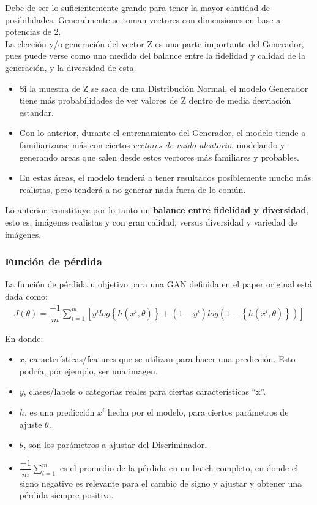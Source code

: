 Debe de ser lo suficientemente grande para tener la mayor cantidad de posibilidades. Generalmente se toman vectores con dimensiones en base a potencias de 2.\\
La elección y/o generación del vector Z es una parte importante del Generador, pues puede verse como una medida del balance entre la fidelidad y calidad de la generación, y la diversidad de esta.
\begin{itemize}
    \item Si la muestra de Z se saca de una Distribución Normal, el modelo Generador tiene más probabilidades de ver valores de Z dentro de media desviación estandar.
    \item Con lo anterior, durante el entrenamiento del Generador, el modelo tiende a familiarizarse más con ciertos \emph{vectores de ruido aleatorio}, modelando y generando areas que salen desde estos vectores más familiares y probables.
    \item En estas áreas, el modelo tenderá a tener resultados posiblemente mucho más realistas, pero tenderá a no generar nada fuera de lo común.
\end{itemize}
Lo anterior, constituye por lo tanto un \textbf{balance entre fidelidad y diversidad}, esto es, imágenes realistas y con gran calidad, versus diversidad y variedad de imágenes.


 \subsubsection{Función de pérdida}

 La función de pérdida u objetivo para una GAN definida en el paper original \cite{goodfellowGenerativeAdversarialNetworks2014} está dada como:
 \begin{align}
     J(\theta) = \dfrac{-1}{m} \sum_{i=1}^{m} \left[
         y^{i} log \left\{ h(x^{i}, \theta)  \right\} +
        \left( 1-y^{i} \right) log \left(  1 -   \left\{ h(x^{i}, \theta)  \right\} \right)
        \right]
    \label{eq:cost_function}
 \end{align}

 En donde:
 \begin{itemize}
    \item \textbf{$x$}, características/features que se utilizan para hacer una predicción. Esto podría, por ejemplo, ser una imagen.
    \item $y$, clases/labels o categorías reales para ciertas características ``x''.
    \item $h$, es una predicción $x^{i}$  hecha por el modelo, para ciertos parámetros de ajuste $\theta$.
    \item $\theta$, son los parámetros a ajustar del Discriminador.
    \item $\dfrac{-1}{m} \sum_{i=1}^{m}$ es el promedio de la pérdida en un batch completo, en donde el signo negativo es relevante para el cambio de signo y ajustar y obtener una pérdida siempre positiva.
 \end{itemize}

